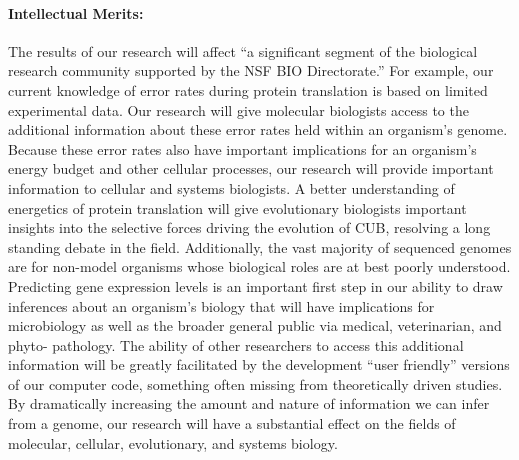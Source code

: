 \documentclass[11pt,fleqn]{article}
\begin{document}
\paragraph*{Intellectual Merits:}
The results of our research will affect ``a significant segment of the biological research community supported by the NSF BIO Directorate.''
For example, our current knowledge of error rates during protein translation is based on limited experimental data. %
Our research will give molecular biologists access to the additional information about these error rates held within an organism's genome.
Because these error rates also have important implications for an organism's energy budget and other cellular processes, our research will provide important information to cellular and systems biologists.
A better understanding of energetics of protein translation will give evolutionary biologists important insights into the selective forces driving the evolution of CUB, resolving a long standing debate in the field.
Additionally, the vast majority of sequenced genomes are for non-model organisms whose biological roles are at best poorly understood.
Predicting gene expression levels is an important first step in our ability to draw inferences about an  organism's biology that will have implications for microbiology as well as the broader general public via medical, veterinarian, and phyto- pathology.
The ability of other researchers to access this additional information will be greatly facilitated by the development ``user friendly'' versions of our computer code, something often missing from theoretically driven studies. %
By dramatically increasing the amount and nature of information we can infer from a genome, our research will have a substantial effect on the fields of molecular, cellular, evolutionary, and systems biology.
\end{document}
